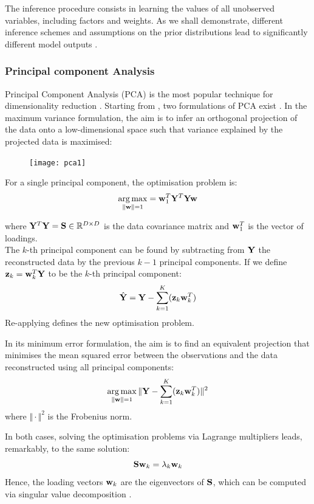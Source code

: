 The inference procedure consists in learning the values of all unobserved variables, including factors and weights. As we shall demonstrate, different inference schemes and assumptions on the prior distributions lead to significantly different model outputs \cite{Rattray2009}.

\subsubsection{Principal component Analysis} \label{section:pca}
Principal Component Analysis (PCA) is the most popular technique for dimensionality reduction \cite{Hotelling1933,Ringner2008}. Starting from , two formulations of PCA exist \cite{Bishop}. In the maximum variance formulation, the aim is to infer an orthogonal projection of the data onto a low-dimensional space such that variance explained by the projected data is maximised:

\begin{figure}[H]
	\centering
	\texttt{[image: pca1]}
	\caption[]{}
	\label{fig:pca1}
\end{figure}

For a single principal component, the optimisation problem is:
\begin{equation} \label{eq:pca}
	\operatorname*{arg\,max}_{\|{\bf w}\|=1} = {\bf w}_1^T {\bf Y}^T {\bf Y} {\bf w}
\end{equation}

where ${\bf Y}^T {\bf Y}={\bf S} \in \mathbb{R}^{D \times D}$ is the data covariance matrix and ${\bf w}_1^T$ is the vector of loadings. \\
The $k$-th principal component can be found by subtracting from ${\bf Y}$ the reconstructed data by the previous $k-1$ principal components. If we define ${\bf z}_k={\bf w}_k^T {\bf Y}$ to be the $k$-th principal component:
\[
	\hat{{\bf Y}} = {\bf Y} - \sum_{k=1}^{K} ({\bf z}_k {\bf w}_k^T)
\]
Re-applying  defines the new optimisation problem.

In its minimum error formulation, the aim is to find an equivalent projection that minimises the mean squared error between the observations and the data reconstructed using all principal components:
\[
	\operatorname*{arg\,max}_{\|{\bf w}\|=1} \Vert {\bf Y} - \sum_{k=1}^{K} ({\bf z}_k {\bf w}_k^T) \Vert^{2}
\]
where $\Vert \cdot \Vert^{2}$ is the Frobenius norm.

In both cases, solving the optimisation problems via Lagrange multipliers leads, remarkably, to the same solution:
\begin{equation}
	{\bf S} {\bf w}_k = \lambda_k {\bf w}_k
\end{equation}
Hence, the loading vectors ${\bf w}_k$ are the eigenvectors of ${\bf S}$, which can be computed via singular value decomposition \cite{Bishop}.

